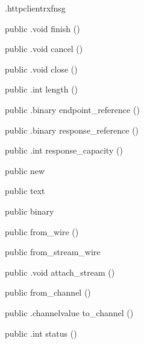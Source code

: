 \begin{CrexxClass}{.httpclient}{rxfnsg}
\begin{Members}
    \Method
      {public}
      {.void}
      {finish}
      {()}

    \Method
      {public}
      {.void}
      {cancel}
      {()}

    \Method
      {public}
      {.void}
      {close}
      {()}

    \Method
      {public}
      {.int}
      {length}
      {()}

    \Method
      {public}
      {.binary}
      {endpoint\_reference}
      {()}

    \Method
      {public}
      {.binary}
      {response\_reference}
      {()}

    \Method
      {public}
      {.int}
      {response\_capacity}
      {()}

    \Factory
      {public}
      {new}
      {}

    \Factory
      {public}
      {text}
      {}

    \Factory
      {public}
      {binary}
      {}

    \Factory
      {public}
      {from\_wire}
      {()}

    \Factory
      {public}
      {from\_stream\_wire}
      {}

    \Method
      {public}
      {.void}
      {attach\_stream}
      {()}

    \Factory
      {public}
      {from\_channel}
      {()}

    \Method
      {public}
      {.channelvalue}
      {to\_channel}
      {()}

    \Method
      {public}
      {.int}
      {status}
      {()}


\end{Members}
\end{CrexxClass}
